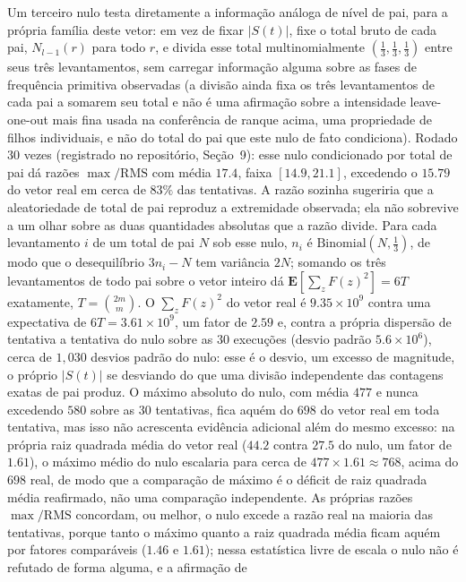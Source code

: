 \documentclass[11pt]{amsart}
\theoremstyle{plain}
\theoremstyle{definition}
\theoremstyle{remark}
\begin{document}
Um terceiro nulo testa diretamente a informação análoga de nível de pai, para a própria família
deste vetor: em vez de fixar $|S(t)|$, fixe o total bruto de cada pai, $N_{l-1}(r)$ para todo $r$, e
divida esse total multinomialmente $(\tfrac13,\tfrac13,\tfrac13)$ entre seus três levantamentos,
sem carregar informação alguma sobre as fases de frequência primitiva observadas (a divisão ainda
fixa os três levantamentos de cada pai a somarem seu total e não é uma afirmação sobre a intensidade
leave-one-out mais fina usada na conferência de ranque acima, uma propriedade de filhos individuais,
e não do total do pai que este nulo de fato condiciona). Rodado $30$ vezes (registrado no
repositório, Seção~9): esse nulo condicionado por total de pai dá razões $\max/\mathrm{RMS}$ com
média $17.4$, faixa $[14.9,21.1]$, excedendo o $15.79$ do vetor real em cerca de $83\%$ das
tentativas. A razão sozinha sugeriria que a aleatoriedade de total de pai reproduz a extremidade
observada; ela não sobrevive a um olhar sobre as duas quantidades absolutas que a razão divide.
Para cada levantamento $i$ de um total de pai $N$ sob esse nulo, $n_i$ é $\mathrm{Binomial}(N,\tfrac13)$,
de modo que o desequilíbrio $3n_i-N$ tem variância $2N$; somando os três levantamentos de todo pai
sobre o vetor inteiro dá $\mathbf{E}[\sum_z F(z)^2]=6T$ exatamente, $T=\binom{2m}{m}$. O
$\sum_z F(z)^2$ do vetor real é $9.35\times10^9$ contra uma expectativa de $6T=3.61\times10^9$, um
fator de $2.59$ e, contra a própria dispersão de tentativa a tentativa do nulo sobre as $30$
execuções (desvio padrão $5.6\times10^6$), cerca de $1{,}030$ desvios padrão do nulo: esse é o
desvio, um excesso de magnitude, o próprio $|S(t)|$ se desviando do que uma divisão independente
das contagens exatas de pai produz. O máximo absoluto do nulo, com média $477$ e nunca excedendo
$580$ sobre as $30$ tentativas, fica aquém do $698$ do vetor real em toda tentativa, mas isso não
acrescenta evidência adicional além do mesmo excesso: na própria raiz quadrada média do vetor real
($44.2$ contra $27.5$ do nulo, um fator de $1.61$), o máximo médio do nulo escalaria para cerca de
$477\times1.61\approx768$, acima do $698$ real, de modo que a comparação de máximo é o déficit de
raiz quadrada média reafirmado, não uma comparação independente. As próprias razões
$\max/\mathrm{RMS}$ concordam, ou melhor, o nulo excede a razão real na maioria das tentativas,
porque tanto o máximo quanto a raiz quadrada média ficam aquém por fatores comparáveis ($1.46$ e
$1.61$); nessa estatística livre de escala o nulo não é refutado de forma alguma, e a afirmação de
\end{document}
